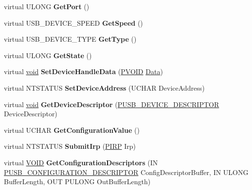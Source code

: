 \begin{DoxyCompactItemize}
virtual U\+L\+O\+NG {\bfseries Get\+Port} ()
\item 
\mbox{\label{class_c_u_s_b_device_a5c54640a73af4569c42e07cb01e5bcbf}} 
virtual U\+S\+B\+\_\+\+D\+E\+V\+I\+C\+E\+\_\+\+S\+P\+E\+ED {\bfseries Get\+Speed} ()
\item 
\mbox{\label{class_c_u_s_b_device_a2eaaa9d303a8d63e5902eacfbeb56c4d}} 
virtual U\+S\+B\+\_\+\+D\+E\+V\+I\+C\+E\+\_\+\+T\+Y\+PE {\bfseries Get\+Type} ()
\item 
\mbox{\label{class_c_u_s_b_device_a8a89b181f4248b5636450f121d53bd6e}} 
virtual U\+L\+O\+NG {\bfseries Get\+State} ()
\item 
\mbox{\label{class_c_u_s_b_device_ae64fcdf5ba11feeaab104efcadfa2fbd}} 
virtual \hyperlink{interfacevoid}{void} {\bfseries Set\+Device\+Handle\+Data} (\hyperlink{interfacevoid}{P\+V\+O\+ID} \hyperlink{struct_data}{Data})
\item 
\mbox{\label{class_c_u_s_b_device_aa1821b99863378b2aac8f8c38250e6ba}} 
virtual N\+T\+S\+T\+A\+T\+US {\bfseries Set\+Device\+Address} (U\+C\+H\+AR Device\+Address)
\item 
\mbox{\label{class_c_u_s_b_device_a26dce43d44de7a4c2dfd8ed28dac555f}} 
virtual \hyperlink{interfacevoid}{void} {\bfseries Get\+Device\+Descriptor} (\hyperlink{struct___u_s_b___d_e_v_i_c_e___d_e_s_c_r_i_p_t_o_r}{P\+U\+S\+B\+\_\+\+D\+E\+V\+I\+C\+E\+\_\+\+D\+E\+S\+C\+R\+I\+P\+T\+OR} Device\+Descriptor)
\item 
\mbox{\label{class_c_u_s_b_device_a697d15b9646ba322bd93112d8d8885f9}} 
virtual U\+C\+H\+AR {\bfseries Get\+Configuration\+Value} ()
\item 
\mbox{\label{class_c_u_s_b_device_a221a87c5c4b57270bc550a48784013b6}} 
virtual N\+T\+S\+T\+A\+T\+US {\bfseries Submit\+Irp} (\hyperlink{interfacevoid}{P\+I\+RP} Irp)
\item 
\mbox{\label{class_c_u_s_b_device_a6c4b9c1098ae6d4d0a46d49b12b316ea}} 
virtual \hyperlink{interfacevoid}{V\+O\+ID} {\bfseries Get\+Configuration\+Descriptors} (IN \hyperlink{struct___u_s_b___c_o_n_f_i_g_u_r_a_t_i_o_n___d_e_s_c_r_i_p_t_o_r}{P\+U\+S\+B\+\_\+\+C\+O\+N\+F\+I\+G\+U\+R\+A\+T\+I\+O\+N\+\_\+\+D\+E\+S\+C\+R\+I\+P\+T\+OR} Config\+Descriptor\+Buffer, IN U\+L\+O\+NG Buffer\+Length, O\+UT P\+U\+L\+O\+NG Out\+Buffer\+Length)

\end{DoxyCompactItemize}
